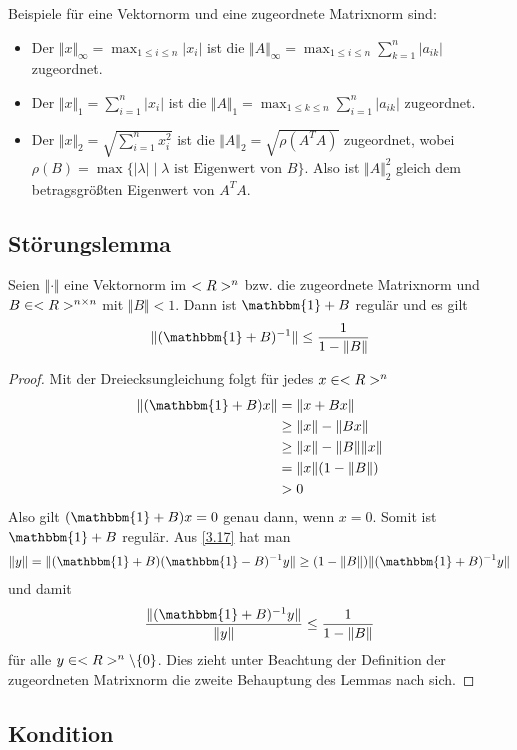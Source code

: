 Beispiele für eine Vektornorm und eine zugeordnete Matrixnorm sind:
\begin{itemize}
	\item Der  $\Vert x\Vert_\infty = \max_{1\le i\le n} \vert x_i\vert$ ist die  $\Vert A\Vert_\infty = \max_{1\le i\le n}\sum_{k=1}^{n}\vert a_{ik}\vert$ zugeordnet.
	\item Der  $\Vert x\Vert_1=\sum_{i=1}^n \vert x_i\vert$ ist die  $\Vert A\Vert_1 = \max_{1\le k\le n}\sum_{i=1}^n \vert a_{ik}\vert$ zugeordnet.
	\item Der  $\Vert x\Vert_2 = \sqrt{\sum_{i=1}^n x_i^2}$ ist die  $\Vert A\Vert_2 = \sqrt{\rho(A^TA)}$ zugeordnet, wobei $\rho(B)=\max\{\vert \lambda\vert\mid \lambda \text{ ist Eigenwert von } B\}$. Also ist $\Vert A\Vert_2^2$ gleich dem betragsgrößten Eigenwert von $A^TA$.
\end{itemize}

\subsection{Störungslemma}

\begin{lemma}
	Seien $\Vert\cdot\Vert$ eine Vektornorm im $<R>^n$ bzw. die zugeordnete Matrixnorm und $B\in<R>^{n\times n}$ mit $\Vert B\Vert<1$. Dann ist $\mathbbm{1}+B$ regulär und es gilt
	\begin{align}
		\Vert (\mathbbm{1}+B)^{-1}\Vert \le \frac{1}{1-\Vert B\Vert}\notag
	\end{align}
\end{lemma}
\begin{proof}
	Mit der Dreiecksungleichung folgt für jedes $x\in<R>^n$
	\begin{align}
		\label{3.17}
		\begin{split}
			\Vert (\mathbbm{1}+B)x\Vert &= \Vert x+Bx\Vert \\
			&\ge \Vert x\Vert - \Vert Bx\Vert \\
			&\ge \Vert x\Vert - \Vert B\Vert\Vert x\Vert \\
			&= \Vert x\Vert (1-\Vert B\Vert) \\
			&> 0
		\end{split}
	\end{align}
	Also gilt $(\mathbbm{1}+B)x=0$ genau dann, wenn $x=0$. Somit ist $\mathbbm{1}+B$ regulär. Aus \cref{3.17} hat man
	\begin{align}
		\Vert y\Vert = \Vert (\mathbbm{1}+B)(\mathbbm{1}-B)^{-1}y\Vert \ge (1-\Vert B\Vert)\Vert (\mathbbm{1}+B)^{-1}y\Vert \notag
	\end{align}
	und damit
	\begin{align}
		\frac{\Vert (\mathbbm{1}+B)^{-1}y\Vert}{\Vert y\Vert} \le \frac{1}{1-\Vert B\Vert}\notag
	\end{align}
	für alle $y\in<R>^n\backslash\{0\}$. Dies zieht unter Beachtung der Definition der zugeordneten Matrixnorm die zweite Behauptung des Lemmas nach sich.
\end{proof}

\subsection{Kondition}